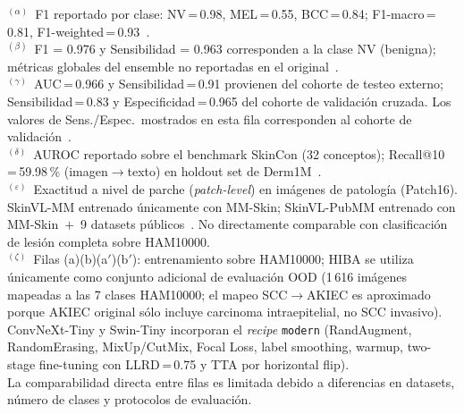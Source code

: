 \begin{table}[htbp]
{\begin{tabular}{@{}lllccrrrrr@{}}
\bottomrule
\end{tabular}%
}
\vspace{4pt}
\begin{minipage}{\textwidth}
  \footnotesize
  $^{(\alpha)}$~F1 reportado por clase: NV\,=\,0.98, MEL\,=\,0.55, BCC\,=\,0.84;
  F1-macro\,=\,0.81, F1-weighted\,=\,0.93~\cite{SkinHealthMate2024}.\\
  $^{(\beta)}$~F1 = 0.976 y Sensibilidad = 0.963 corresponden a la clase NV
  (benigna); métricas globales del ensemble no reportadas en el original~\cite{EnsembleDL2025}.\\
  $^{(\gamma)}$~AUC\,=\,0.966 y Sensibilidad\,=\,0.91 provienen del cohorte de
  testeo externo; Sensibilidad\,=\,0.83 y Especificidad\,=\,0.965 del cohorte
  de validación cruzada. Los valores de Sens./Espec.\ mostrados en esta fila
  corresponden al cohorte de validación~\cite{MPXVCNN2023}.\\
  $^{(\delta)}$~AUROC reportado sobre el benchmark SkinCon (32 conceptos);
  Recall@10\,=\,59.98\,\% (imagen$\to$texto) en holdout set de Derm1M~\cite{DermLIP2025}.\\
  $^{(\varepsilon)}$~Exactitud a nivel de parche (\textit{patch-level}) en imágenes
  de patología (Patch16). SkinVL-MM entrenado únicamente con MM-Skin;
  SkinVL-PubMM entrenado con MM-Skin~$+$~9 datasets públicos~\cite{MMSkin2025}.
  No directamente comparable con clasificación de lesión completa sobre HAM10000.\\
  $^{(\zeta)}$~Filas (a)(b)(a$'$)(b$'$): entrenamiento sobre HAM10000; HIBA se
  utiliza únicamente como conjunto adicional de evaluación OOD (1\,616 imágenes
  mapeadas a las 7 clases HAM10000; el mapeo SCC$\to$AKIEC es aproximado
  porque AKIEC original sólo incluye carcinoma intraepitelial, no SCC invasivo).
  ConvNeXt-Tiny y Swin-Tiny incorporan el \textit{recipe} \texttt{modern}
  (RandAugment, RandomErasing, MixUp/CutMix, Focal Loss, label smoothing,
  warmup, two-stage fine-tuning con LLRD\,=\,0.75 y TTA por horizontal flip).\\
  La comparabilidad directa entre filas es limitada debido a diferencias
  en datasets, número de clases y protocolos de evaluación.
\end{minipage}
\end{table}



